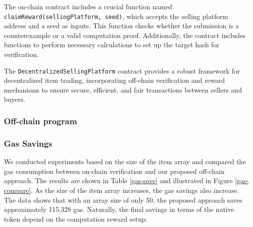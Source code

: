 \documentclass[runningheads]{llncs}
\begin{document}
The on-chain contract includes a crucial function named \texttt{claimReward(sellingPlatform, seed)}, which accepts the selling platform address and a seed as inputs. This function checks whether the submission is a counterexample or a valid computation proof. Additionally, the contract includes functions to perform necessary calculations to set up the target hash for verification.

The \texttt{DecentralizedSellingPlatform} contract provides a robust framework for decentralized item trading, incorporating off-chain verification and reward mechanisms to ensure secure, efficient, and fair transactions between sellers and buyers.
\subsubsection{Off-chain program}
\subsubsection{Gas Savings} We conducted experiments based on the size of the item array and compared the gas consumption between on-chain verification and our proposed off-chain approach. The results are shown in Table \ref{gas-save} and illustrated in Figure \ref{gas-compare}. As the size of the item array increases, the gas savings also increase. The data shows that with an array size of only 50, the proposed approach saves approximately 115,328 gas. Naturally, the final savings in terms of the native token depend on the computation reward setup.
\end{document}

